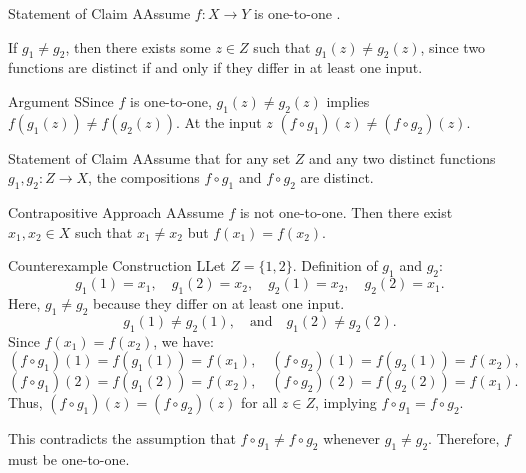 \documentclass{report}
\begin{document}

\begin{ClaimWithMagnolia}{Statement of Claim}
    AAssume $f: X \to Y$ is one-to-one .
\end{ClaimWithMagnolia}

\begin{keyideaWithLotus}
    If $g_1 \neq g_2$, then there exists some $z \in Z$ such that $g_1(z) \neq g_2(z)$, since two functions are distinct if and only if they differ in at least one input.
\end{keyideaWithLotus}

\begin{RemarkWithLily}{Argument}
    SSince $f$ is one-to-one, $g_1(z) \neq g_2(z)$ implies $f(g_1(z)) \neq f(g_2(z))$. At the input $z$ $(f \circ g_1)(z) \neq (f \circ g_2)(z)$. 
\end{RemarkWithLily}

\begin{ClaimWithMagnolia}{Statement of Claim}
    AAssume that for any set $Z$ and any two distinct functions $g_1, g_2: Z \to X$, the compositions $f \circ g_1$ and $f \circ g_2$ are distinct. 
\end{ClaimWithMagnolia}

\begin{ContrapositiveWithLycoris}{Contrapositive Approach}
    AAssume $f$ is not one-to-one. Then there exist $x_1, x_2 \in X$ such that $x_1 \neq x_2$ but $f(x_1) = f(x_2)$. 
\end{ContrapositiveWithLycoris}
    
\begin{RemarkWithLily}{Counterexample Construction}
    LLet $Z = \{1, 2\}$. Definition of $g_1$ and $g_2$:
    \[
    g_1(1) = x_1, \quad g_1(2) = x_2, \quad g_2(1) = x_2, \quad g_2(2) = x_1.
    \]
    Here, $g_1 \neq g_2$ because they differ on at least one input.
    \[
    g_1(1) \neq g_2(1), \quad \text{and} \quad g_1(2) \neq g_2(2).
    \]
    Since $f(x_1) = f(x_2)$, we have:
    \[
    (f \circ g_1)(1) = f(g_1(1)) = f(x_1), \quad (f \circ g_2)(1) = f(g_2(1)) = f(x_2),
    \]
    \[
    (f \circ g_1)(2) = f(g_1(2)) = f(x_2), \quad (f \circ g_2)(2) = f(g_2(2)) = f(x_1).
    \]
    Thus, $(f \circ g_1)(z) = (f \circ g_2)(z)$ for all $z \in Z$, implying $f \circ g_1 = f \circ g_2$.

    This contradicts the assumption that $f \circ g_1 \neq f \circ g_2$ whenever $g_1 \neq g_2$. Therefore, $f$ must be one-to-one.
\end{RemarkWithLily}
\end{document}
